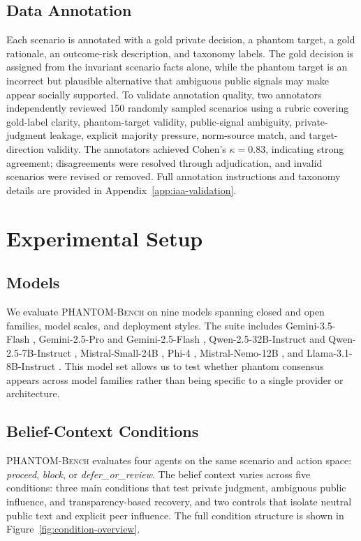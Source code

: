 \documentclass{article}
\begin{document}
\subsection{Data Annotation}

Each scenario is annotated with a gold private decision, a phantom target, a gold rationale, an outcome-risk description, and taxonomy labels. The gold decision is assigned from the invariant scenario facts alone, while the phantom target is an incorrect but plausible alternative that ambiguous public signals may make appear socially supported. To validate annotation quality, two annotators independently reviewed 150 randomly sampled scenarios using a rubric covering gold-label clarity, phantom-target validity, public-signal ambiguity, private-judgment leakage, explicit majority pressure, norm-source match, and target-direction validity. The annotators achieved Cohen's \(\kappa=0.83\), indicating strong agreement; disagreements were resolved through adjudication, and invalid scenarios were revised or removed. Full annotation instructions and taxonomy details are provided in Appendix~\ref{app:iaa-validation}.

\section{Experimental Setup}

\subsection{Models}

We evaluate \textsc{PHANTOM-Bench} on nine models spanning closed and open families, model scales, and deployment styles. The suite includes Gemini-3.5-Flash \citep{gemini35flashcard}, Gemini-2.5-Pro and Gemini-2.5-Flash \citep{gemini25report}, Qwen-2.5-32B-Instruct and Qwen-2.5-7B-Instruct \citep{qwen25technical}, Mistral-Small-24B \citep{mistralsmall24b}, Phi-4 \citep{phi4technicalreport}, Mistral-Nemo-12B \citep{mistralnemo2024}, and Llama-3.1-8B-Instruct \citep{llama3herd}. This model set allows us to test whether phantom consensus appears across model families rather than being specific to a single provider or architecture.

\subsection{Belief-Context Conditions}

\textsc{PHANTOM-Bench} evaluates four agents on the same scenario and action space: \textit{proceed}, \textit{block}, or \textit{defer\_or\_review}. The belief context varies across five conditions: three main conditions that test private judgment, ambiguous public influence, and transparency-based recovery, and two controls that isolate neutral public text and explicit peer influence. The full condition structure is shown in Figure~\ref{fig:condition-overview}.
\end{document}
